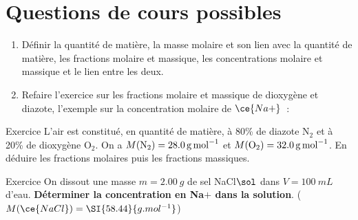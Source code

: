 \documentclass[a4paper, 12pt, final, garamond]{book}
\begin{document}
\section{Questions de cours possibles}
\begin{enumerate}
    \item Définir la quantité de matière, la masse molaire et son lien avec la
        quantité de matière, les fractions molaire et massique, les
        concentrations molaire et massique et le lien entre les deux.

    \item Refaire l'exercice sur les fractions molaire et massique de dioxygène
        et diazote, l'exemple sur la concentration molaire de $\ce{Na+}$~:
\end{enumerate}
\begin{tcbraster}[raster columns=2, raster equal height=rows]
    \begin{NCexem}[width=\linewidth]{Exercice}
        L'air est constitué, en quantité de matière, à 80\% de diazote N$_2$ et
        à 20\% de dioxygène O$_2$. On a $M({\rm N_2}) = \SI{28.0}{g.mol^{-1}}$
        et $M({\rm O_2}) = \SI{32.0}{g.mol^{-1}}$. En déduire les fractions
        molaires puis les fractions massiques.
    \end{NCexem}
    \begin{NCexem}[]{Exercice}
        On dissout une masse $m = \SI{2.00}{g}$ de sel NaCl$\sol$ dans $V =
        \SI{100}{mL}$ d'eau. \textbf{Déterminer la concentration en
        Na$\plus{}$ dans la solution}. ($M(\ce{NaCl}) = \SI{58.44}{g.mol^{-1}}$)
    \end{NCexem}
\end{tcbraster}
\end{document}

